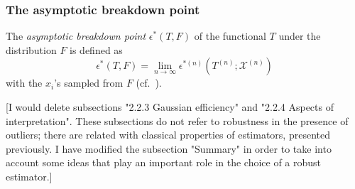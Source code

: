 

\subsubsection{The asymptotic breakdown point}

The \emph{asymptotic breakdown point} $\epsilon^*(T, F)$ of the functional
$T$ under the distribution $F$ is defined as
\[
    \epsilon^*(T, F) = \lim_{n\rightarrow\infty} \epsilon^{*(n)}(T^{(n)}; \mathcal{X}^{(n)})
\]
with the $x_i$'s sampled from $F$ (cf.\ \citealp{hampel:1971}).               


\alert{[I would delete subsections "2.2.3 Gaussian efficiency" and "2.2.4
Aspects of interpretation". These subsections do not refer to robustness in the
presence of outliers; there are related with classical properties of
estimators, presented previously. I have modified the subsection "Summary" in
order to take into account some ideas that play an important role in the choice
of a robust estimator.]}






